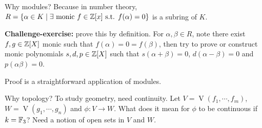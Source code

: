     Why modules? Because in number theory, $R = \{\alpha \in K \mid \exists \  \text{monic }f \in \mathbb{Z}[x] \text{ s.t. } f(\alpha) = 0\}$ is a subring of $K$. \par
    \textbf{Challenge-exercise:} prove this by definition. For $\alpha,\beta \in R$, note there exist $f,g \in \mathbb{Z}[X]$ monic such that $f(\alpha) = 0 = f(\beta)$, then try to prove or construct monic polynomials $s,d,p \in \mathbb{Z}[X]$ such that $s(\alpha + \beta) = 0$, $d(\alpha-\beta) = 0$ and $p(\alpha \beta) = 0$. \par
    Proof is a straightforward application of modules. \par
    Why topology? To study geometry, need continuity. Let $V = \operatorname{V}(f_1,\cdots,f_m)$, $W = \operatorname{V}(g_1,\cdots,g_n)$ and $\phi: V \to W$. What does it mean for $\phi$ to be continuous if $k = \mathbb{F}_3$? Need a notion of open sets in $V$ and $W$.

